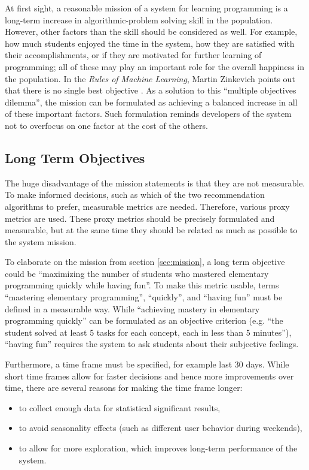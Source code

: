 At first sight, a reasonable mission of a system for learning programming
  is a long-term increase in algorithmic-problem solving skill in the population.
However, other factors than the skill should be considered as well.
For example, how much students enjoyed the time in the system,
  how they are satisfied with their accomplishments,
  or if they are motivated for further learning of programming;
  all of these may play an important role for the overall happiness in the population.
In the \emph{Rules of Machine Learning}, Martin Zinkevich
  points out that there is no single best objective \cite[][Rule \#39]{google-ml-rules}.
As a solution to this ``multiple objectives dilemma'',
  the mission can be formulated as achieving a balanced increase in all
  of these important factors.
Such formulation reminds developers of the system not to overfocus on one factor
  at the cost of the others.


\subsection{Long Term Objectives}
\label{sec:long-term-objectives}

The huge disadvantage of the mission statements
  is that they are not measurable.
To make informed decisions,
  such as which of the two recommendation algorithms to prefer,
  measurable metrics are needed.
Therefore, various proxy metrics are used.
These proxy metrics should be precisely formulated and measurable,
  but at the same time they should be related as much as possible to the system mission.

To elaborate on the mission from section \ref{sec:mission},
  a long term objective could be
  ``maximizing the number of students
  who mastered elementary programming quickly while having fun''.
To make this metric usable,
  terms ``mastering elementary programming'', ``quickly'', and ``having fun''
  must be defined in a measurable way.
While ``achieving mastery in elementary programming quickly'' can be
  formulated as an objective criterion
  (e.g. ``the student solved at least 5 tasks for each concept, each in less than 5 minutes''),
  ``having fun'' requires the system to ask students about their subjective feelings.

Furthermore, a time frame must be specified, for example last 30 days.
While short time frames allow for faster decisions and hence more improvements over time,
there are several reasons for making the time frame longer:
\begin{itemize}
  \item to collect enough data for statistical significant results,
  \item to avoid seasonality effects (such as different user behavior during weekends),
  \item to allow for more exploration, which improves long-term performance of the system.
\end{itemize}

